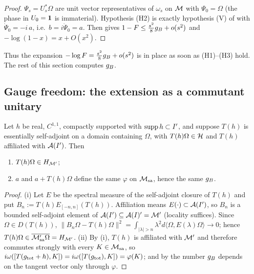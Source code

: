 \begin{proof}
$\Psi_{s}=U_{s}^{*}\Omega$ are unit vector representatives of $\omega_{s}$ on $\mathcal M$ with $\Psi_{0}=\Omega$
(the phase in $U_{0}=\mathbf 1$ is immaterial).  Hypothesis (H2) is exactly hypothesis (V) of
 with $\dot\Psi_{0}=-i\,a$, i.e.\ $b=i\dot\Psi_{0}=a$.  Then  gives
$1-F\le\frac{s^{2}}{8}g_{B}+o(s^{2})$ and $-\log(1-x)=x+O(x^{2})$.
\end{proof}

Thus the expansion $-\log F=\frac{s^{2}}{8}g_{B}+o(s^{2})$ is in place as soon as (H1)--(H3) hold.  The rest
of this section computes $g_{B}$.

\subsection{Gauge freedom: the extension as a commutant unitary}

\begin{lemma}\label{lem:gauge}
Let $h$ be real, $C^{1,1}$, compactly supported with $\operatorname{supp} h\subset I'$, and suppose $T(h)$ is essentially
self-adjoint on a domain containing $\Omega$, with $T(h)\Omega\in\mathcal H$ and $T(h)$ affiliated with
$\mathcal A(I')$.  Then
\begin{enumerate}[label=\textup{(\roman*)},leftmargin=2.4em]
\item $T(h)\Omega\in H_{\mathcal M'}$;
\item $a$ and $a+T(h)\Omega$ define the same $\varphi$ on $\mathcal M_{\rm sa}$, hence the same $g_{B}$.
\end{enumerate}
\end{lemma}

\begin{proof}
(i) Let $E$ be the spectral measure of the self-adjoint closure of $T(h)$ and put
$B_{n}:=T(h)E_{[-n,n]}(T(h))$.  Affiliation means $E(\cdot)\subset\mathcal A(I')$, so $B_{n}$ is a bounded
self-adjoint element of $\mathcal A(I')\subseteq\mathcal A(I)'=\mathcal M'$ (locality suffices).  Since
$\Omega\in D(T(h))$, $\|B_{n}\Omega-T(h)\Omega\|^{2}=\int_{|\lambda|>n}\lambda^{2}
d\langle\Omega,E(\lambda)\Omega\rangle\to0$; hence $T(h)\Omega\in\overline{\mathcal M'_{\rm sa}\Omega}=H_{\mathcal M'}$.
(ii) By (i), $T(h)$ is affiliated with $\mathcal M'$ and therefore commutes strongly with every $K\in\mathcal M_{\rm sa}$,
so $i\omega([T(g_{\rm tot}+h),K])=i\omega([T(g_{\rm tot}),K])=\varphi(K)$; and by  the
number $g_{B}$ depends on the tangent vector only through $\varphi$.
\end{proof}

